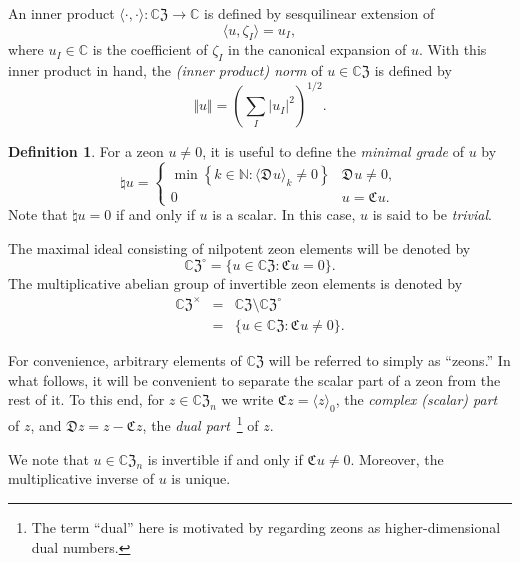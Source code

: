 \documentclass{article}
\theoremstyle{definition}
\newtheorem{definition}[theorem]{Definition}
\newcommand{\zco}{\mathfrak{C}\mspace{1mu}}
\newcommand{\zdu}{\mathfrak{D}\mspace{1mu}}
\newcommand{\CZ}{\mathbb{C}\mathfrak{Z}}
\numberwithin{equation}{section}
\begin{document}
An inner product $\langle\cdot,\cdot\rangle:\CZ\to\mathbb{C}$ is defined by sesquilinear extension of \begin{equation*}
\langle u,\zeta_I\rangle = u_I,
\end{equation*}
where $u_I\in\mathbb{C}$ is the coefficient of $\zeta_I$ in the canonical expansion of $u$.
With this inner product in hand, the {\em (inner product) norm} of $u\in\CZ$ is defined by \begin{equation}\label{IP norm on CZ}
\Vert u\Vert=\left(\sum_I \vert u_I\vert^2\right)^{1/2}.
\end{equation}


\begin{definition}
For a zeon $u\ne 0$, it is useful to define the {\em minimal grade} of $u$ by \begin{equation}\label{mingrade def}
\natural u =\begin{cases}
\min\left\{k\in \mathbb{N}: \langle \zdu u\rangle_k\ne 0\right\}& \zdu u\ne 0,\\
0&u=\zco u.
\end{cases}
\end{equation}
Note that $\natural u=0$ if and only if $u$ is a scalar.  In this case, $u$ is said to be {\em trivial}.
\end{definition}

The maximal ideal consisting of nilpotent zeon elements will be denoted by \begin{equation*}
{\CZ}^\circ=\{u\in \CZ: \zco u=0\}.
\end{equation*}   
The multiplicative abelian group of invertible zeon elements is denoted by \begin{eqnarray*}
{\CZ}^\times&=&\CZ\setminus {\CZ}^\circ\\
&=&\{u\in \CZ: \zco u\ne 0\}.
\end{eqnarray*}

For convenience, arbitrary elements of $\CZ$ will be referred to simply as ``zeons.''  In what follows, it will be convenient to separate the scalar part of a zeon from the rest of it. To this end, for $z\in\CZ_n$ we write $\zco z=\langle z\rangle_0$, the {\em complex (scalar) part} of $z$, and $\mathfrak{D}z=z-\zco z$, the {\em dual part}~\footnote{The term ``dual'' here is motivated by regarding zeons as higher-dimensional dual numbers.} of $z$.


We note that  $u\in\CZ_n$ is invertible if and only if $\zco u\ne 0$.  Moreover, the multiplicative inverse of $u$ is unique.  
\end{document}
